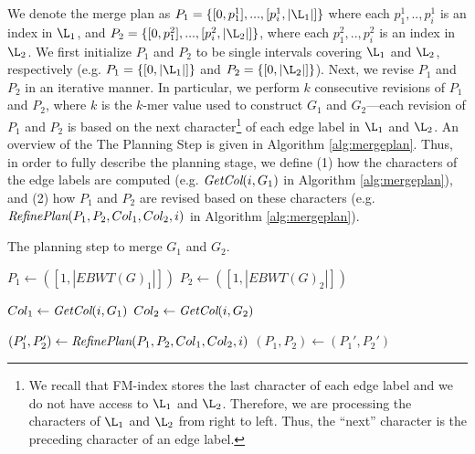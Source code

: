 We denote the merge plan as $P_1 = \{[0, p^1_1],...,[p^1_i, |\L_{1}|]\}$ where each $p^1_1,..,p^1_i$ is an index in $\L_{1}$, and $P_2 = \{[0, p^2_1],...,[p^2_i, |\L_{2}|]\}$, where each $p^2_1,..,p^2_i$ is an index in $\L_{2}$.   We first initialize $P_1$ and $P_2$ to be single intervals covering $\L_1$ and $\L_2$, respectively (e.g. $P_1 = \{[0, |\L_1|]\}$ and  $P_2 = \{[0, |\L_2|]\}$). Next, we revise $P_1$ and $P_2$ in an iterative manner.  In particular, we perform $k$ consecutive revisions of $P_1$ and $P_2$, where $k$ is the $k$-mer value used to construct $G_1$ and $G_2$---each revision of $P_1$ and $P_2$ is based on the next character\footnote{We recall that FM-index stores the last character of each edge label and we do not have access to $\L_1$ and $\L_2$.  Therefore, we are processing the characters of $\L_1$ and $\L_2$ from right to left.  Thus, the ``next'' character is the preceding character of an edge label.} of each edge label in $\L_1$ and $\L_2$.  An overview of the The Planning Step is given in Algorithm \ref{alg:mergeplan}.  Thus, in order to fully describe the planning stage, we define (1) how the characters of the edge labels are computed (e.g. $\emph{GetCol}(i, G_1)$ in Algorithm \ref{alg:mergeplan}), and (2) how $P_1$ and $P_2$ are revised based on these characters (e.g. $\emph{RefinePlan}(P_1, P_2, Col_1, Col_2, i)$ in Algorithm \ref{alg:mergeplan}). 


\begin{algorithm}[h!]
\caption{The planning step to merge $G_1$ and $G_2$. } %
\label{alg:mergeplan}
\begin{algorithmic}
    
  \State {}
  \State $P_1 \leftarrow ([1, |EBWT(G)_1|])$
  \State $P_2 \leftarrow ([1, |EBWT(G)_2|])$

    \State $Col_1 \leftarrow \emph{GetCol}(i, G_1)$
    \State $Col_2 \leftarrow \emph{GetCol}(i, G_2)$

  \State {}
    \State $(P_1', P_2') \leftarrow \emph{RefinePlan}(P_1, P_2, Col_1, Col_2, i)$
    \State $(P_1, P_2) \leftarrow (P_1', P_2')$
    \EndFor
\end{algorithmic}

\end{algorithm}


